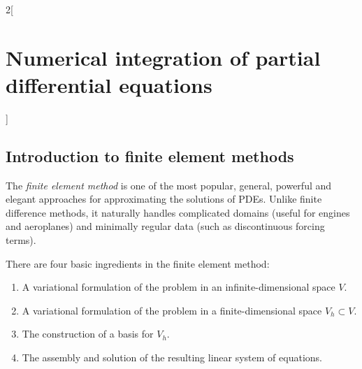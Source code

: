 \documentclass[../../../main_math.tex]{subfiles}
\begin{document}
\begin{multicols}{2}[\section{Numerical integration of partial differential equations}]
  \subsection{Introduction to finite element methods}
  The \emph{finite element method} is one of the most popular, general,
  powerful and elegant approaches for approximating the solutions of
  PDEs. Unlike finite difference methods, it naturally handles complicated domains (useful for engines and aeroplanes) and minimally
  regular data (such as discontinuous forcing terms).

  There are four basic ingredients in the finite element method:
  \begin{enumerate}
    \item A variational formulation of the problem in an infinite-dimensional space $V$.
    \item A variational formulation of the problem in a finite-dimensional space $V_h\subset V$.
    \item The construction of a basis for $V_h$.
    \item The assembly and solution of the resulting linear system of equations.
  \end{enumerate}

\end{multicols}
\end{document}
